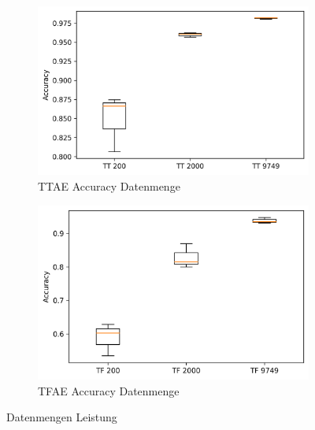 	\begin{figure}[h]
		\centering
		\begin{subfigure}[c]{0.49\textwidth}			
			\includegraphics[width=1\textwidth,center]{bilder/Hauptteil/Transfer_Logs_Datenmenge/Acc_Transfer_Logs_data.png}
			\caption{TTAE Accuracy Datenmenge}
			\label{img:TT_ACC_DATA}	
		\end{subfigure}
		\begin{subfigure}[c]{0.49\textwidth}			
			\includegraphics[width=1\textwidth, center]{bilder/Hauptteil/Transfer_Logs_Datenmenge/Acc_MT_Logs_data.png}
			\caption{TFAE Accuracy Datenmenge}
			\label{img:TF_ACC_DATA}	
		\end{subfigure}	
		\caption{Datenmengen Leistung}
		\label{img:DatenmengenLeistung}
	\end{figure}
		
		
		
		
		
		
		
		
			
		
		
		
		
		
		
		
	
	